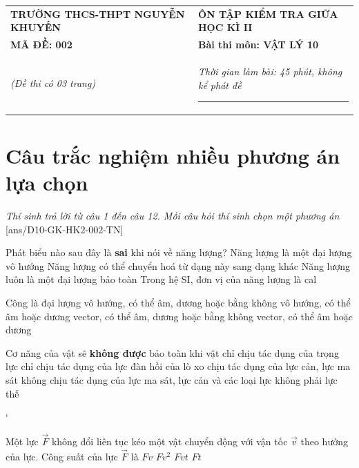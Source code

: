\begin{center}
	\begin{tabular}{M{9.25cm}M{8.75cm}}
		\textbf{TRƯỜNG THCS-THPT NGUYỄN KHUYẾN}& \textbf{ÔN TẬP KIỂM TRA GIỮA HỌC KÌ II}\\
		\textbf{MÃ ĐỀ: 002}& \textbf{Bài thi môn: VẬT LÝ 10}\\
		\textit{(Đề thi có 03 trang)}& \textit{Thời gian làm bài: 45 phút, không kể phát đề}
		
		\noindent\rule{4cm}{0.8pt} \\
	\end{tabular}
\end{center}
\setcounter{section}{0}
\section{Câu trắc nghiệm nhiều phương án lựa chọn}
\textit{Thí sinh trả lời từ câu 1 đến câu 12. Mỗi câu hỏi thí sinh chọn một phương án}
\setcounter{ex}{0}
[ans/D10-GK-HK2-002-TN]
\begin{ex}
	Phát biểu nào sau đây là \textbf{sai} khi nói về năng lượng?
	\choice
	{Năng lượng là một đại lượng vô hướng}
	{Năng lượng có thể chuyển hoá từ dạng này sang dạng khác}
	{Năng lượng luôn là một đại lượng bảo toàn}
	{\True Trong hệ SI, đơn vị của năng lượng là cal}
	\loigiai{}
\end{ex}
\begin{ex}
	Công là đại lượng
	\choice
	{\True vô hướng, có thể âm, dương hoặc bằng không}
	{vô hướng, có thể âm hoặc dương}
	{vector, có thể âm, dương hoặc bằng không}
	{vector, có thể âm hoặc dương}
	\loigiai{}
\end{ex}
\begin{ex}
	Cơ năng của vật sẽ \textbf{không được} bảo toàn khi vật
	\choice
	{chỉ chịu tác dụng của trọng lực}
	{chỉ chịu tác dụng của lực đàn hồi của lò xo}
	{\True chịu tác dụng của lực cản, lực ma sát}
	{không chịu tác dụng của lực ma sát, lực cản và các loại lực không phải lực thế}
	\loigiai{}
\end{ex}`
\begin{ex}
	Một lực $\vec{F}$ không đổi liên tục kéo một vật chuyển động với vận tốc $\vec{v}$ theo hướng của lực. Công suất của lực $\vec{F}$ là
	\choice
	{\True $Fv$}
	{$Fv^2$}
	{$Fvt$}
	{$Ft$}
	\loigiai{}
\end{ex}


